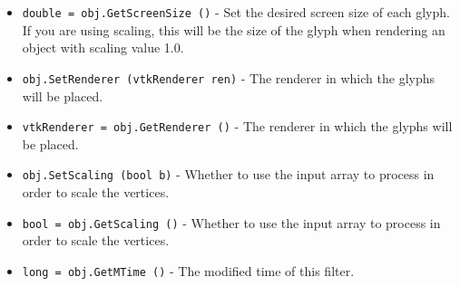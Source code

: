 \begin{itemize}
\item  \verb|double = obj.GetScreenSize ()| -  Set the desired screen size of each glyph. If you are using scaling,
 this will be the size of the glyph when rendering an object with
 scaling value 1.0.

\item  \verb|obj.SetRenderer (vtkRenderer ren)| -  The renderer in which the glyphs will be placed.

\item  \verb|vtkRenderer = obj.GetRenderer ()| -  The renderer in which the glyphs will be placed.

\item  \verb|obj.SetScaling (bool b)| -  Whether to use the input array to process in order to scale the
 vertices.

\item  \verb|bool = obj.GetScaling ()| -  Whether to use the input array to process in order to scale the
 vertices.

\item  \verb|long = obj.GetMTime ()| -  The modified time of this filter.

\end{itemize}
